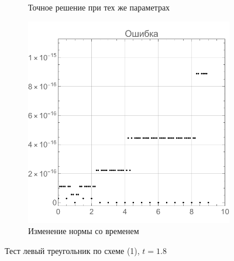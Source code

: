 \documentclass[12pt, a4paper]{article}
\begin{document}
\begin{figure}[!hp]
\begin{subfigure}[t]{0.32\textwidth}
		\caption{Точное решение при тех же параметрах}
		\label{test2}
	\end{subfigure}
	\hfill
	\begin{subfigure}[t]{0.32\textwidth}
		\centering
		\includegraphics[width=\textwidth]{res3_3}
		\caption{Изменение нормы со временем}
		\label{test3}
	\end{subfigure}
	\caption{Тест левый треугольник по схеме (1), $t = 1.8$}
\end{figure}
\end{document}
